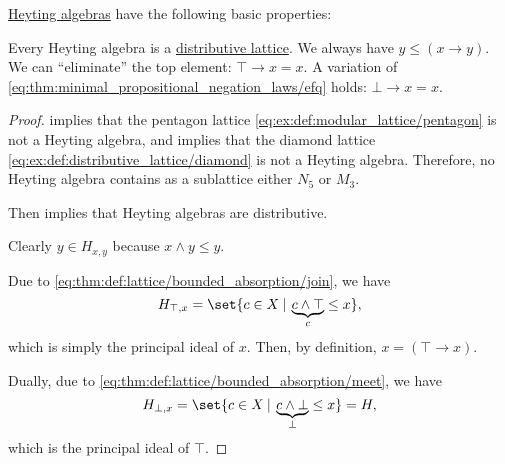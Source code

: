 \begin{proposition}\label{thm:def:heyting_algebra}
  \hyperref[def:heyting_algebra]{Heyting algebras} have the following basic properties:
  \begin{thmenum}
     Every Heyting algebra is a \hyperref[def:distributive_lattice]{distributive lattice}.
     We always have \( y \leq (x \rightarrow y) \).
     We can \enquote{eliminate} the top element: \( \top \rightarrow x = x \).
     A variation of \eqref{eq:thm:minimal_propositional_negation_laws/efq} holds: \( \bot \rightarrow x = x \).
  \end{thmenum}
\end{proposition}
\begin{proof}
    implies that the pentagon lattice \eqref{eq:ex:def:modular_lattice/pentagon} is not a Heyting algebra, and  implies that the diamond lattice \eqref{eq:ex:def:distributive_lattice/diamond} is not a Heyting algebra. Therefore, no Heyting algebra contains as a sublattice either \( N_5 \) or \( M_3 \).

  Then  implies that Heyting algebras are distributive.

   Clearly \( y \in H_{x,y} \) because \( x \wedge y \leq y \).

   Due to \eqref{eq:thm:def:lattice/bounded_absorption/join}, we have
  \begin{equation*}
    H_{\top,x} = \set{ c \in X \given \underbrace{c \wedge \top}_{c} \leq x },
  \end{equation*}
  which is simply the principal ideal of \( x \). Then, by definition, \( x = (\top \rightarrow x) \).

   Dually, due to \eqref{eq:thm:def:lattice/bounded_absorption/meet}, we have
  \begin{equation*}
    H_{\bot,x} = \set{ c \in X \given \underbrace{c \wedge \bot}_{\bot} \leq x } = H,
  \end{equation*}
  which is the principal ideal of \( \top \).
\end{proof}

